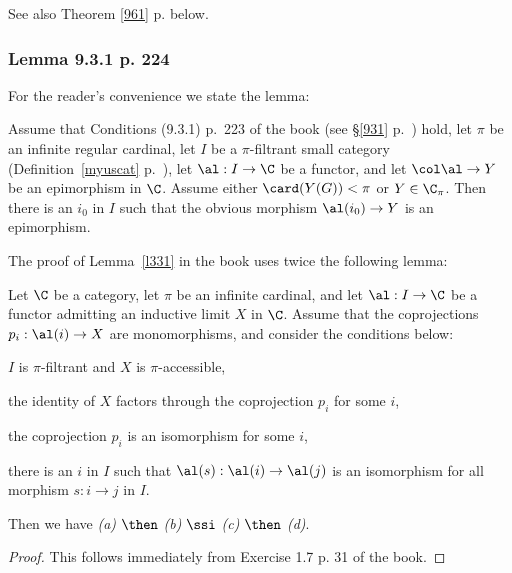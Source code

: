 \documentclass[12pt]{article}
\theoremstyle{remark}
\theoremstyle{definition}
\begin{document}
See also Theorem \ref{961} p.  below.

%

\subsubsection{Lemma 9.3.1 p. 224}

For the reader's convenience we state the lemma:

\begin{lem}[Lemma 9.3.1 p. 224]
Assume that Conditions (9.3.1) p.~223 of the book (see \S\ref{931} p.~) hold, let $\pi$ be an infinite regular cardinal, let $I$ be a $\pi$-filtrant small category (Definition~\ref{myuscat} p.~), let $\al:I\to\C$ be a functor, and let $\col\al\to Y$ be an epimorphism in $\C$. Assume either $\card(Y(G))<\pi$ or $Y\in\C_\pi$. Then there is an $i_0$ in $I$ such that the obvious morphism $\al(i_0)\to Y$ is an epimorphism.
\end{lem}

The proof of Lemma~\ref{l331} in the book uses twice the following lemma:

\begin{lem} 
Let $\C$ be a category, let $\pi$ be an infinite cardinal, and let $\al:I\to\C$ be a functor admitting an inductive limit $X$ in $\C$. Assume that the coprojections $p_i:\al(i)\to X$ are monomorphisms, and consider the conditions below:

 $I$ is $\pi$-filtrant and $X$ is $\pi$-accessible,

 the identity of $X$ factors through the coprojection $p_i$ for some $i$,

 the coprojection $p_i$ is an isomorphism for some $i$,

 there is an $i$ in $I$ such that $\al(s):\al(i)\to\al(j)$ is an isomorphism for all morphism $s:i\to j$ in $I$.

\nn Then we have {\em(a)} $\then$ {\em(b)} $\ssi$ {\em(c)} $\then$ {\em(d)}. 
\end{lem}

\begin{proof}
This follows immediately from Exercise 1.7 p. 31 of the book.
\end{proof}


\end{document}
